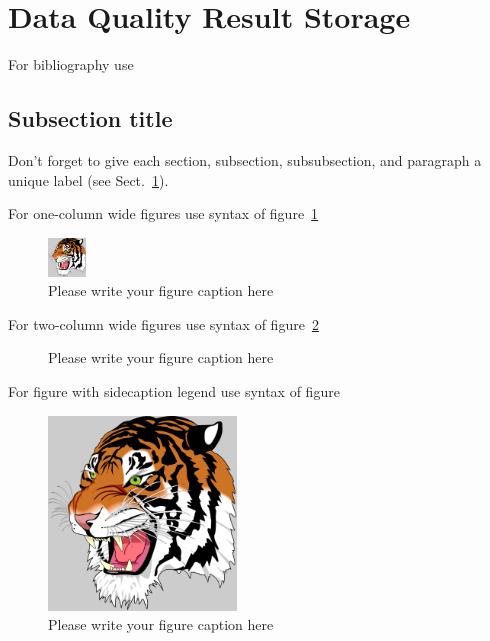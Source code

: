 \documentclass{webofc}
\begin{document}
\section{Data Quality Result Storage}
\label{sec-1}
For bibliography use \cite{RefJ}
\subsection{Subsection title}
\label{sec-2}
Don't forget to give each section, subsection, subsubsection, and
paragraph a unique label (see Sect.~\ref{sec-1}).

For one-column wide figures use syntax of figure~\ref{fig-1}
\begin{figure}[h]
\centering
\includegraphics[width=1cm,clip]{tiger}
\caption{Please write your figure caption here}
\label{fig-1}       %
\end{figure}

For two-column wide figures use syntax of figure~\ref{fig-2}
\begin{figure}
\centering
\vspace*{5cm}       %
\caption{Please write your figure caption here}
\label{fig-2}       %
\end{figure}

For figure with sidecaption legend use syntax of figure
\begin{figure}
\centering
\sidecaption
\includegraphics[width=5cm,clip]{tiger}
\caption{Please write your figure caption here}
\label{fig-3}       %
\end{figure}
\end{document}
